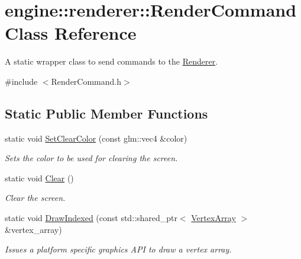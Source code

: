 \hypertarget{classengine_1_1renderer_1_1RenderCommand}{}\section{engine\+:\+:renderer\+:\+:Render\+Command Class Reference}
\label{classengine_1_1renderer_1_1RenderCommand}


A static wrapper class to send commands to the \hyperlink{classengine_1_1renderer_1_1Renderer}{Renderer}.  




{\ttfamily \#include $<$Render\+Command.\+h$>$}

\subsection*{Static Public Member Functions}
\begin{DoxyCompactItemize}
\item 
\mbox{\label{classengine_1_1renderer_1_1RenderCommand_a75d9aa5aa62fe99c104ab7ca6308a540}} 
static void \hyperlink{classengine_1_1renderer_1_1RenderCommand_a75d9aa5aa62fe99c104ab7ca6308a540}{Set\+Clear\+Color} (const glm\+::vec4 \&color)
\begin{DoxyCompactList}\small\item\em Sets the color to be used for clearing the screen. \end{DoxyCompactList}\item 
\mbox{\label{classengine_1_1renderer_1_1RenderCommand_a256a904ae55dc4d942ca360d79f51319}} 
static void \hyperlink{classengine_1_1renderer_1_1RenderCommand_a256a904ae55dc4d942ca360d79f51319}{Clear} ()
\begin{DoxyCompactList}\small\item\em Clear the screen. \end{DoxyCompactList}\item 
\mbox{\label{classengine_1_1renderer_1_1RenderCommand_a4ebe11280458d27ba102c13f62fa7359}} 
static void \hyperlink{classengine_1_1renderer_1_1RenderCommand_a4ebe11280458d27ba102c13f62fa7359}{Draw\+Indexed} (const std\+::shared\+\_\+ptr$<$ \hyperlink{classengine_1_1renderer_1_1VertexArray}{Vertex\+Array} $>$ \&vertex\+\_\+array)
\begin{DoxyCompactList}\small\item\em Issues a platform specific graphics A\+PI to draw a vertex array. \end{DoxyCompactList}\end{DoxyCompactItemize}


